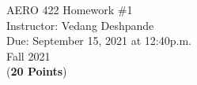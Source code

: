 \documentclass[]{article}
\begin{document}

\begin{center}
    {\Large AERO 422 Homework \#1}\\ %
    \vspace{0.2 cm}
    Instructor: Vedang Deshpande\\ %
    \vspace{0.2 cm}
    Due: September 15, 2021 at 12:40p.m.\\ %
    \vspace{0.2 cm}
    Fall 2021\\ %
    \vspace{0.2 cm}
    (\textbf{20 Points})\\
\end{center}

\vspace{0.2 cm}
\end{document}
